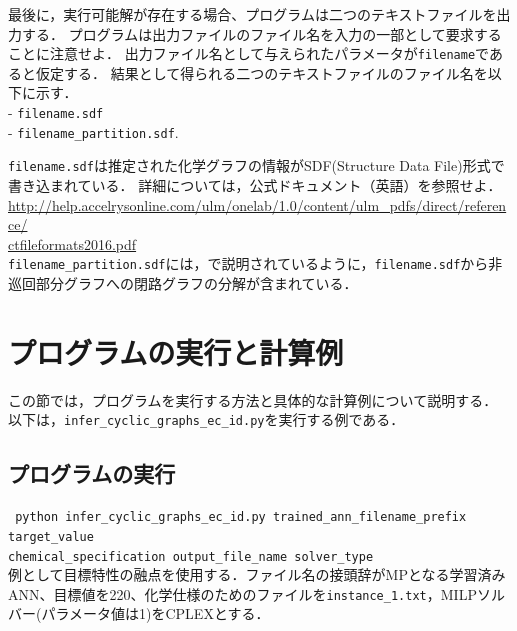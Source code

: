 \documentclass[11pt,titlepage,dvipdfmx,twoside]{jsbook}
\newcommand{\target}{目標}
\begin{document}
最後に，実行可能解が存在する場合、プログラムは二つのテキストファイルを出力する．
プログラムは出力ファイルのファイル名を入力の一部として要求することに注意せよ．
出力ファイル名として与えられたパラメータが{\tt filename}であると仮定する．
結果として得られる二つのテキストファイルのファイル名を以下に示す． \\
- {\tt filename.sdf}\\
- {\tt filename\_partition.sdf}. 

\noindent
{\tt filename.sdf}は推定された化学グラフの情報がSDF(Structure Data File)形式で書き込まれている．
詳細については，公式ドキュメント（英語）を参照せよ． \\
\url{http://help.accelrysonline.com/ulm/onelab/1.0/content/ulm_pdfs/direct/reference/}\\
\url{ctfileformats2016.pdf}\\

\noindent
{\tt filename\_partition.sdf}には，\cite{cyclic_BH_arxiv}で説明されているように，{\tt filename.sdf}から非巡回部分グラフへの閉路グラフの分解が含まれている．

\section{プログラムの実行と計算例}
\label{chap:Exp}

この節では，プログラムを実行する方法と具体的な計算例について説明する．
以下は，{\tt infer\_cyclic\_graphs\_ec\_id.py}を実行する例である．

\subsection{プログラムの実行}
\label{chap:Exp_1}




\noindent
{\tt 
 python  infer\_cyclic\_graphs\_ec\_id.py 
trained\_ann\_filename\_prefix
target\_value \\
 \phantom{python }
 chemical\_specification
output\_file\_name
solver\_type
 }\\

例として\target 特性の融点を使用する．ファイル名の接頭辞がMPとなる学習済みANN、\target 値を220、化学仕様のためのファイルを{\tt instance\_1.txt}，MILPソルバー(パラメータ値は1)をCPLEX\cite{cplex}とする．
\end{document}
